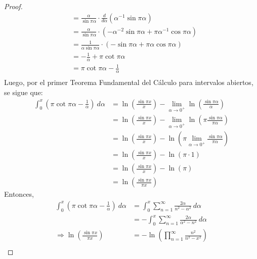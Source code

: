 \documentclass[12pt]{report}
\theoremstyle{largebreak}
\begin{document}
\begin{proof}
\begin{equation*}
\begin{split}
                &=\frac{\alpha}{\sin \pi\alpha}\cdot\frac{d}{d\alpha}\left(\alpha^{-1}\sin \pi\alpha\right)\\
                &=\frac{\alpha}{\sin \pi\alpha}\cdot\left(-\alpha^{-2}\sin\pi\alpha+\pi\alpha^{-1}\cos\pi\alpha\right)\\
                &=\frac{1}{\alpha\sin \pi\alpha}\cdot\left(-\sin\pi\alpha+\pi\alpha\cos\pi\alpha\right)\\
                &=-\frac{1}{\alpha}+\pi\cot\pi\alpha\\
                &=\pi\cot\pi\alpha-\frac{1}{\alpha}\\
            \end{split}
        \end{equation*}
        Luego, por el primer Teorema Fundamental del Cálculo para intervalos abiertos, se sigue que:
        \begin{equation*}
            \begin{split}
                \int_0^x\left(\pi\cot\pi\alpha-\frac{1}{\alpha}\right)\:d\alpha&=\ln\left(\frac{\sin \pi x}{x}\right)-\lim_{\alpha\rightarrow0^+}\ln\left(\frac{\sin \pi\alpha}{\alpha}\right)\\
                &=\ln\left(\frac{\sin \pi x}{x}\right)-\lim_{\alpha\rightarrow0^+}\ln\left(\pi\frac{\sin \pi\alpha}{\pi\alpha}\right)\\
                &=\ln\left(\frac{\sin \pi x}{x}\right)-\ln\left(\pi\lim_{\alpha\rightarrow0^+}\frac{\sin \pi\alpha}{\pi\alpha}\right)\\
                &=\ln\left(\frac{\sin \pi x}{x}\right)-\ln\left(\pi\cdot1\right)\\
                &=\ln\left(\frac{\sin \pi x}{x}\right)-\ln(\pi)\\
                &=\ln\left(\frac{\sin \pi x}{\pi x}\right)
            \end{split}
        \end{equation*}
        Entonces,
        \begin{equation*}
            \begin{split}
                \int_0^x\left(\pi\cot\pi\alpha-\frac{1}{\alpha}\right)\:d\alpha&=\int_0^x\sum_{ n=1}^\infty\frac{2\alpha}{n^2-\alpha^2}\:d\alpha\\
                &=-\int_0^x\sum_{ n=1}^\infty\frac{2\alpha}{\alpha^2-n^2}\:d\alpha\\
                \Rightarrow \ln\left(\frac{\sin \pi x}{\pi x}\right)&=-\ln\left(\prod_{ n=1}^\infty\frac{n^2}{n^2-x^2}\right)\\

\end{split}
\end{equation*}
\end{proof}
\end{document}
